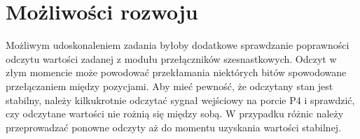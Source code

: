 \documentclass[fleqn]{article}
\begin{document}
\section{Możliwości rozwoju}

Możliwym udoskonaleniem zadania byłoby dodatkowe sprawdzanie poprawności odczytu wartości zadanej z modułu przełączników szesnastkowych. Odczyt w złym momencie może powodować przekłamania niektórych bitów spowodowane przełączaniem między pozycjami. Aby mieć pewność, że odczytany stan jest stabilny, należy kilkukrotnie odczytać sygnał wejściowy na porcie P4 i sprawdzić, czy odczytane wartości nie rożnią się między sobą. W przypadku różnic należy przeprowadzać ponowne odczyty aż do momentu uzyskania wartości stabilnej.
\end{document}
